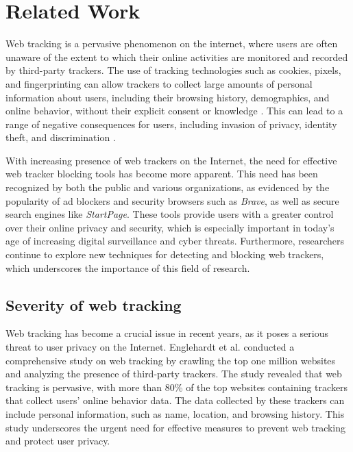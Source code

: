 \chapter{Related Work}
\label{cha:relatedwork}

Web tracking is a pervasive phenomenon on the internet, where users are 
often unaware of the extent to which their online activities are monitored
and recorded by third-party trackers. The use of tracking technologies such
as cookies, pixels, and fingerprinting can allow trackers to collect large 
amounts of personal information about users, including their browsing history,
demographics, and online behavior, without their explicit consent or knowledge 
\cite{englehardt2016online,hoofnagle2010different}. This can lead to a range of
negative consequences for users, including invasion of privacy, identity theft,
and discrimination \cite{hannak2013measuring,narayanan2010myths}.

With increasing presence of web trackers on the Internet, the need for effective
web tracker blocking tools has become more apparent. This need has been recognized
by both the public and various organizations, as evidenced by the popularity of ad
blockers and security browsers such as \textit{Brave}, as well as secure search engines
like \textit{StartPage}. These tools provide users with a greater control over their
online privacy and security, which is especially important in today's age of increasing
digital surveillance and cyber threats. Furthermore, researchers continue to explore
new techniques for detecting and blocking web trackers, which underscores the importance
of this field of research.

\section{Severity of web tracking} 

Web tracking has become a crucial issue in recent years, as it poses 
a serious threat to user privacy on the Internet. Englehardt et al. \cite{englehardt2016online}
conducted a comprehensive study on web tracking by crawling the top one
million websites and analyzing the presence of third-party trackers.
The study revealed that web tracking is pervasive, with more than 80\%
of the top websites containing trackers that collect users' online
behavior data. The data collected by these trackers can include personal
information, such as name, location, and browsing history. This study
underscores the urgent need for effective measures to prevent web
tracking and protect user privacy.

